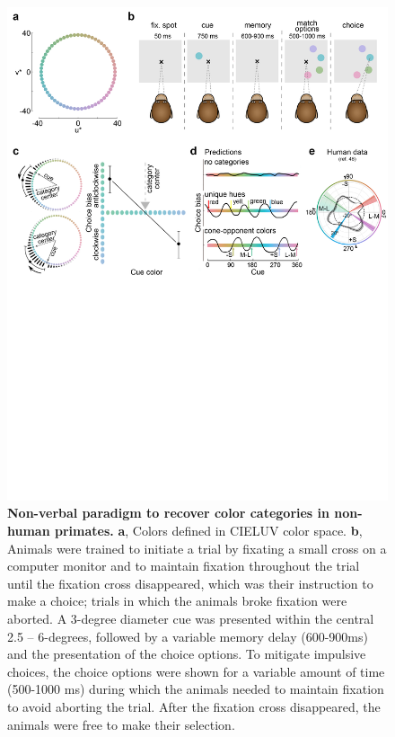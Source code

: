 \begin{figure}
    \begin{fullwidth}
    \centering
    \includegraphics[width=\textwidth+4cm,trim={0 12.5cm 0 0},clip]{../Figures/flat/F1_ParadigmPredictions_6.jpg}
    \caption{\textbf{Non-verbal paradigm to recover color categories in non-human primates.}
    \textbf{a}, Colors defined in CIELUV color space. 
	\textbf{b}, Animals were trained to initiate a trial by fixating a small cross on a computer monitor and to maintain fixation throughout the trial until the fixation cross disappeared, which was their instruction to make a choice; trials in which the animals broke fixation were aborted. 
	A 3-degree diameter cue was presented within the central 2.5 – 6-degrees, followed by a variable memory delay (600-900ms) and the presentation of the choice options. 
	To mitigate impulsive choices, the choice options were shown for a variable amount of time (500-1000 ms) during which the animals needed to maintain fixation to avoid aborting the trial. After the fixation cross disappeared, the animals were free to make their selection. 
}
\end{fullwidth}
\end{figure}
